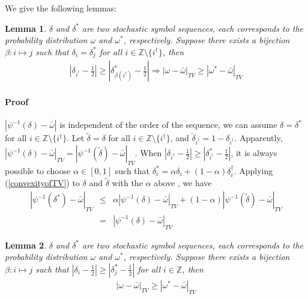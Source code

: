\documentclass{article}
\newtheorem{lemma}{Lemma}
\begin{document}
We give the following lemmas:

\begin{lemma}
\label{onedifflemma}
$\delta$ and $\delta^*$ are two stochastic symbol sequences, each corresponds to the probability distribution $\omega$ and $\omega^*$, respectively. Suppose there exists a bijection $\beta: i \mapsto j$ such that $\delta_i = \delta^*_j$ for all $i\in \mathbb{Z}\setminus\{i^\dagger\}$, then
 \begin{eqnarray}
   |\delta_{i^\dagger}-\frac{1}{2}| \ge |\delta^*_{\beta(i^\dagger)}-\frac{1}{2}| \Rightarrow |\omega-\bar{\omega} |_{TV} \ge |\omega^*-\bar{\omega} |_{TV}
 \end{eqnarray}
\end{lemma}
\paragraph{Proof} $|\psi^{-1}(\delta)-\bar{\omega}|$ is independent of the order of the sequence, we can assume $\delta = \delta^*$ for all $i\in \mathbb{Z}\setminus\{i^\dagger\}$. Let $\tilde{\delta} = \delta$ for all $i\in \mathbb{Z}\setminus\{i^\dagger\}$, and $\tilde{\delta}_{i^\dagger}=1-\delta_{i^\dagger}$. Apparently, $|\psi^{-1}(\delta)-\bar{\omega}|_{TV} =|\psi^{-1}(\tilde{\delta})-\bar{\omega}|_{TV} $. When $|\delta_{i^\dagger}-\frac{1}{2}| \ge |\delta^*_{i^\dagger}-\frac{1}{2}|$, it is always possible to choose $\alpha\in[0,1]$ such that  $\delta^*_i = \alpha \delta_i +(1-\alpha) \delta^\dagger_i $. Applying (\ref{convexityofTV}) to $\delta$ and $\tilde{\delta}$ with the $\alpha$ above , we have
\begin{eqnarray}
    |\psi^{-1}(\delta^*)-\bar{\omega}|_{TV} 
                 &\le&  \alpha|\psi^{-1}(\delta)-\bar{\omega} |_{TV}+(1-\alpha)|\psi^{-1}(\tilde{\delta})-\bar{\omega}|_{TV} \nonumber\\
                 & = & |\psi^{-1}(\delta)-\bar{\omega} |_{TV}
 \end{eqnarray}

\begin{lemma}
\label{alldifflemma}
$\delta$ and $\delta^*$ are two stochastic symbol sequences, each corresponds to the probability distribution $\omega$ and $\omega^*$, respectively. Suppose there exists a bijection $\beta: i \mapsto j$ such that $|\delta_i-\frac{1}{2}| \ge |\delta^*_j-\frac{1}{2} |$ for all $i\in \mathbb{Z}$, then
 \begin{eqnarray}
   |\omega-\bar{\omega} |_{TV} \ge|\omega^*-\bar{\omega} |_{TV}
 \end{eqnarray}
\end{lemma}
\end{document}

